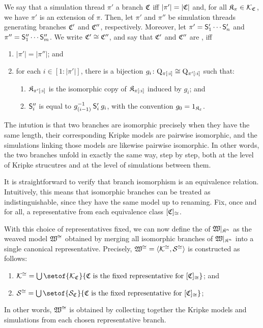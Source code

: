 \begin{definition}
    \medskip
    \noindent
    We say that a simulation thread $\pi'$  a branch $\mathfrak{C}$ iff $|\pi'| = |\mathfrak{C}|$ and, for all $\mathfrak{K}_{\pi} \in \mathcal{K}_{\mathfrak{C}_{}}$, we have $\pi'$ is an extension of $\pi$.
    Then, let $\pi'$ and $\pi''$ be simulation threads generating branches $\mathfrak{C}'$ and $\mathfrak{C}''$, respectively.
    Moreover, let $\pi' = \Sim'_1 \dots \Sim'_n$ and $\pi'' = \Sim''_1 \dots \Sim''_m$. We write $\mathfrak{C}' \cong \mathfrak{C}''$, and say that $\mathfrak{C}'$ and $\mathfrak{C}''$ are , iff
    \begin{enumerate}[leftmargin=\parindent]
        \setlength{\itemsep}{0pt}
        \item $|\pi'| = |\pi''|$; and
        \item for each $i \in [1{:}|\pi'|]$, there is a bijection $g_i\colon \mathrm{Q}_{\pi[{:}i]} \cong \mathrm{Q}_{\pi'[{:}i]}$ such that:
        \begin{enumerate}[leftmargin=\parindent]
            \setlength{\itemsep}{0pt}
            \item $\mathfrak{K}_{\pi'[{:}i]}$ is the isomorphic copy of $\mathfrak{K}_{\pi[:{i}]}$ induced by $g_i$; and
            \item $\mathbin{\mathsf{S}}''_i$ is equal to $g_{(i-1)}^{-1} \mathbin{\mathsf{S}}'_i g_i$, with the convention $g_0 = {\mathrm{1}}_{\mathfrak{K}_\varepsilon}$.
        \end{enumerate}
    \end{enumerate}
    The intution is that two branches are isomorphic precisely when they have the same length, their corresponding Kripke models are pairwise isomorphic, and the simulations linking those models are likewise pairwise isomorphic. In other words, the two branches unfold in exactly the same way, step by step, both at the level of Kripke strucutres and at the level of simulations between them.

    \medskip
    \noindent
    It is straightforward to verify that branch isomorphism is an equivalence relation.
    Intuitively, this means that isomorphic branches can be treated as indistinguishable, since they have the same model up to renaming.
    Fix, once and for all, a representative from each equivalence class $[\mathfrak{C}]_{\cong}$.
    
    \medskip
    \noindent
    With this choice of representatives fixed, we can now define the  of $\mathfrak{W}\vert_{\mathfrak{K}^{n}}$ as
    the weaved model $\mathfrak{W}^{\cong}$ obtained by merging all isomorphic branches of $\mathfrak{W}\vert_{\mathfrak{K}^{n}}$ into a single canonical representative.
    Precisely, $\mathfrak{W}^{\cong} = \langle\mathcal{K}_{}^{\cong}, \mathcal{S}_{}^{\cong}\rangle$ is constructed as follows:
    \begin{enumerate}[leftmargin=\parindent]
        \setlength{\itemsep}{0pt}
        \item $\Kiwm = \bigcup \setof{\Kbwm}{\bwmodel \mbox{ is the fixed representative for } [\bwmodel]_{\cong}}$; and 
        \item $\Siwm = \bigcup \setof{\Sbwm}{\bwmodel \mbox{ is the fixed representative for } [\bwmodel]_{\cong}}$;
    \end{enumerate}
    In other words, $\mathfrak{W}^{\cong}$ is obtained by collecting together the Kripke models and simulations from each chosen representative branch.
\end{definition}

